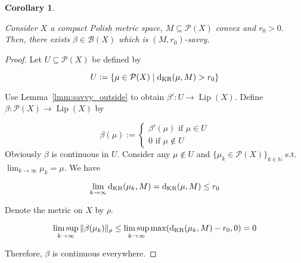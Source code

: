 \documentclass[11pt]{article}
\theoremstyle{definition}
\theoremstyle{plain}
\newtheorem{corollary}{Corollary}%
\newcommand{\Nats}{\mathbb{N}}
\newcommand{\N}[1]{\lVert #1 \rVert}
\newcommand{\Sq}[2]{\{#1\}_{#2 \in \Nats}}
\newcommand{\PM}{\mathcal{P}}
\newcommand{\Lp}{{\operatorname{Lip}}}
\newcommand{\DKR}{\operatorname{d}_{\textnormal{KR}}}
\newcommand{\Gm}{\mathcal{B}}
\begin{document}
\begin{samepage}
\begin{corollary}
\label{crl:savvy}

Consider $X$ a compact Polish metric space, $M \subseteq \PM(X)$ convex and $r_0 > 0$. Then, there exists $\beta \in \Gm(X)$ which is $(M,r_0)$-savvy.

\end{corollary}
\end{samepage}

\begin{proof}

Let $U \subseteq \PM(X)$ be defined by

$$U:=\{\mu \in \PM(X) \mid \DKR(\mu, M) > r_0\}$$

Use Lemma~\ref{lmm:savvy_outside} to obtain $\beta': U \rightarrow \Lp(X)$. Define $\beta: \PM(X) \rightarrow \Lp(X)$ by

$$\beta(\mu):=\begin{cases}\beta'(\mu) \text{ if } \mu \in U\\0 \text { if } \mu \not\in U\end{cases}$$ 
Obviously $\beta$ is continuous in $U$. Consider any $\mu \not\in U$ and $\Sq{\mu_k \in \PM(X)}{k}$ s.t. $\lim_{k \rightarrow \infty} \mu_k = \mu$. We have 

$$\lim_{k \rightarrow \infty} \DKR(\mu_k,M) = \DKR(\mu, M) \leq r_0$$

Denote the metric on $X$ by $\rho$. 

$$\limsup_{k \rightarrow \infty}{\N{\beta(\mu_k)}_\rho} \leq \limsup_{k \rightarrow \infty}{\max(\DKR(\mu_k,M) - r_0, 0)} = 0$$

Therefore, $\beta$ is continuous everywhere.
\end{proof}
\end{document}
